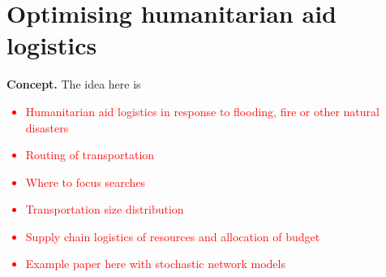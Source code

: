 \chapter{\sffamily Optimising humanitarian aid logistics}

{\bfseries\sffamily Concept.} The idea here is 

\textcolor{red}{
\begin{itemize}
\item{Humanitarian aid logistics in response to flooding, fire or other natural disasters}
\item{Routing of transportation}
\item{Where to focus searches}
\item{Transportation size distribution}
\item{Supply chain logistics of resources and allocation of budget}
\item{Example paper here with stochastic network models~\cite{alem2016stochastic}}
\end{itemize}
}